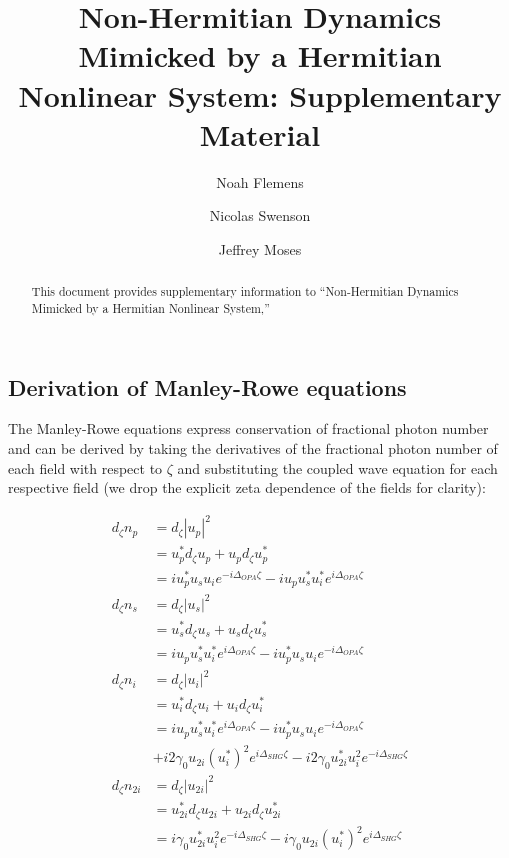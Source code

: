 \documentclass[%
 reprint,
 amsmath,amssymb,
 aps,
floatfix,
]{revtex4-2}
\begin{document}
\title{Non-Hermitian Dynamics Mimicked by a Hermitian Nonlinear System: Supplementary Material}

\author{Noah Flemens}
\author{Nicolas Swenson}
\author{Jeffrey Moses}



\begin{abstract}
This document provides supplementary information to “Non-Hermitian Dynamics Mimicked by a Hermitian Nonlinear System,” 
\end{abstract}

\maketitle
\subsection{Derivation of Manley-Rowe equations}

The Manley-Rowe equations express conservation of fractional photon number and can be derived by taking the derivatives of the fractional photon number of each field with respect to $\zeta$ and substituting the coupled wave equation for each respective field (we drop the explicit zeta dependence of the fields for clarity):

\begin{align*}
    d_{\zeta}n_p & = d_{\zeta}|u_p|^2\\
                 & = u_p^* d_{\zeta}u_p + u_p d_{\zeta}u_p^*\\
                 & = i u_p^* u_s u_i e^{-i\Delta_{OPA}\zeta} - i u_p u_s^* u_i^* e^{i\Delta_{OPA}\zeta}\\
    d_{\zeta}n_s & = d_{\zeta}|u_s|^2\\
                 & = u_s^* d_{\zeta}u_s + u_s d_{\zeta}u_s^*\\
                 & = i u_p u_s^* u_i^* e^{i\Delta_{OPA}\zeta} - i u_p^* u_s u_i e^{-i\Delta_{OPA}\zeta}\\
    d_{\zeta}n_i & = d_{\zeta}|u_i|^2\\
                 & = u_i^* d_{\zeta}u_i + u_i d_{\zeta}u_i^*\\
                 & = i u_p u_s^* u_i^* e^{i\Delta_{OPA}\zeta} - i u_p^* u_s u_i e^{-i\Delta_{OPA}\zeta}\\ 
                 & + i 2\gamma_0 u_{2i} (u_i^*)^2 e^{i\Delta_{SHG}\zeta} - i 2\gamma_0 u_{2i}^* u_i^2 e^{-i\Delta_{SHG}\zeta}\\
    d_{\zeta}n_{2i} & = d_{\zeta}|u_{2i}|^2\\
                 & = u_{2i}^* d_{\zeta}u_{2i} + u_{2i} d_{\zeta}u_{2i}^*\\
                 & = i \gamma_0 u_{2i}^* u_i^2 e^{-i\Delta_{SHG}\zeta} - i \gamma_0 u_{2i} (u_i^*)^2 e^{i\Delta_{SHG}\zeta}
\end{align*}
\end{document}
